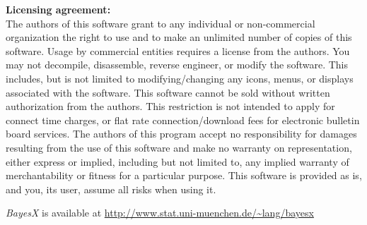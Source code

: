 \vspace{2cm}

{\bf Licensing agreement:} \\
The authors of this software grant to any individual or
non-commercial organization the right to use and to make an
unlimited number of copies of this software. Usage by commercial
entities requires a license from the authors. You may not
decompile, disassemble, reverse engineer, or modify the software.
This includes, but is not limited to modifying/changing any icons,
menus, or displays associated with the software. This software
cannot be sold without written authorization from the authors.
This restriction is not intended to apply for connect time
charges, or flat rate connection/download fees for electronic
bulletin board services. The authors of this program accept no
responsibility for damages resulting from the use of this software
and make no warranty on representation, either express or implied,
including but not limited to, any implied warranty of
merchantability or fitness for a particular purpose. This software
is provided as is, and you, its user, assume all risks when using
it.

\vspace{0.5cm}

{\em BayesX} is available at {
\href{http://www.stat.uni-muenchen.de/~lang/bayesx}{http://www.stat.uni-muenchen.de/\~{}lang/bayesx}}


\newpage

 \tableofcontents
\hypertarget{contents}{}


\newpage

